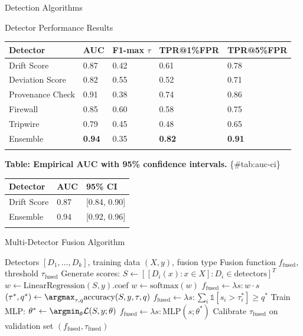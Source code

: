 \documentclass[
  ignorenonframetext,
]{beamer}
\newcounter{none} %
\begin{document}
\begin{frame}{Detection Algorithms}
\begin{block}{Detector Performance Results}
{\def\LTcaptype{none} %
\begin{longtable}[]{@{}lllll@{}}
\toprule\noalign{}
Detector & AUC & F1-max \(\tau\) & TPR@1\%FPR & TPR@5\%FPR \\
\midrule\noalign{}
\endhead
Drift Score & 0.87 & 0.42 & 0.61 & 0.78 \\
Deviation Score & 0.82 & 0.55 & 0.52 & 0.71 \\
Provenance Check & 0.91 & 0.38 & 0.74 & 0.86 \\
Firewall & 0.85 & 0.60 & 0.58 & 0.75 \\
Tripwire & 0.79 & 0.45 & 0.48 & 0.65 \\
Ensemble & \textbf{0.94} & 0.35 & \textbf{0.82} & \textbf{0.91} \\
\bottomrule\noalign{}
\end{longtable}
}

\textbf{Table: Empirical AUC with 95\% confidence intervals.}
\{\#tab:auc-ci\}

{\def\LTcaptype{none} %
\begin{longtable}[]{@{}lll@{}}
\toprule\noalign{}
Detector & AUC & 95\% CI \\
\midrule\noalign{}
\endhead
Drift Score & 0.87 & {[}0.84, 0.90{]} \\
Ensemble & 0.94 & {[}0.92, 0.96{]} \\
\bottomrule\noalign{}
\end{longtable}
}
\end{block}

\begin{block}{Multi-Detector Fusion Algorithm}
\protect{}\label{multi-detector-fusion-algorithm}
\begin{algorithm}
\caption{Multi-Detector Fusion}
\label{alg:fusion}
\begin{algorithmic}[1]
\Require Detectors $[D_1, \ldots, D_k]$, training data $(X, y)$, fusion type
\Ensure Fusion function $f_{\text{fused}}$, threshold $\tau_{\text{fused}}$
\State Generate scores: $S \gets [[D_i(x) : x \in X] : D_i \in \text{detectors}]^T$
    \State $w \gets \text{LinearRegression}(S, y).\text{coef}$
    \State $w \gets \text{softmax}(w)$
    \State $f_{\text{fused}} \gets \lambda s: w \cdot s$
    \State $(\tau^*, q^*) \gets \argmax_{\tau,q} \text{accuracy}(S, y, \tau, q)$
    \State $f_{\text{fused}} \gets \lambda s: \sum_i \mathbb{1}[s_i > \tau_i^*] \geq q^*$
    \State Train MLP: $\theta^* \gets \argmin_\theta \mathcal{L}(S, y; \theta)$
    \State $f_{\text{fused}} \gets \lambda s: \text{MLP}(s; \theta^*)$
\EndIf
\State Calibrate $\tau_{\text{fused}}$ on validation set
\State \Return $(f_{\text{fused}}, \tau_{\text{fused}})$
\end{algorithmic}
\end{algorithm}


\end{block}
\end{frame}
\end{document}
